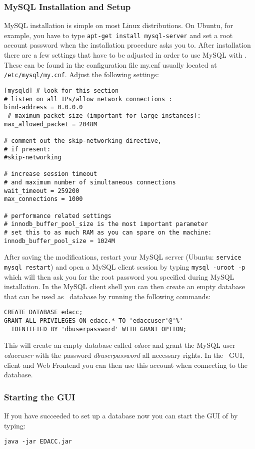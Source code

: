 \subsubsection{MySQL Installation and Setup}
\label{mysqlsetup}
MySQL installation is simple on most Linux distributions. On Ubuntu, for example, you
have to type \texttt{apt-get install mysql-server} and set a root account password
when the installation procedure asks you to.
 After installation there are a few settings
that have to be adjusted in order to use MySQL with \edacc. These can be found in the configuration file
my.cnf usually located at \texttt{/etc/mysql/my.cnf}. Adjust the following settings:
\begin{verbatim}
[mysqld] # look for this section
# listen on all IPs/allow network connections :
bind-address = 0.0.0.0
 # maximum packet size (important for large instances):
max_allowed_packet = 2048M

# comment out the skip-networking directive,
# if present:
#skip-networking

# increase session timeout
# and maximum number of simultaneous connections
wait_timeout = 259200
max_connections = 1000

# performance related settings
# innodb_buffer_pool_size is the most important parameter
# set this to as much RAM as you can spare on the machine:
innodb_buffer_pool_size = 1024M
\end{verbatim}
After saving the modifications, restart your MySQL server (Ubuntu: \texttt{service mysql restart})
and open a MySQL client session by typing \texttt{mysql -uroot -p} which will then ask you for
the root password you specified during MySQL installation.
In the MySQL client shell you can then create an empty database that can be used as \edacc~database
by running the following commands:
\begin{verbatim}
CREATE DATABASE edacc;
GRANT ALL PRIVILEGES ON edacc.* TO 'edaccuser'@'%'
  IDENTIFIED BY 'dbuserpassword' WITH GRANT OPTION;
\end{verbatim}
This will create an empty database called \textit{edacc} and grant the MySQL user \textit{edaccuser}
with the password \textit{dbuserpassword} all necessary rights. In the \edacc~GUI, client and Web Frontend
you can then use this account when connecting to the database.

\subsubsection{Starting the GUI}
If you have succeeded to set up a database now you can start the GUI of \edacc by typing:
\begin{verbatim}
java -jar EDACC.jar
\end{verbatim} 
